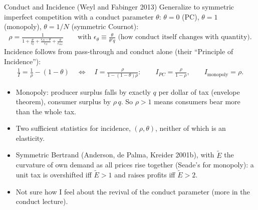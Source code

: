 \documentclass[aspectratio=169,10pt]{beamer}
\begin{document}
\begin{frame}{Conduct and Incidence (Weyl and Fabinger 2013)}
\small
Generalize to symmetric imperfect competition with a conduct parameter $\theta$: $\theta=0$ (PC), $\theta=1$ (monopoly), $\theta = 1/N$ (symmetric Cournot):
\begin{align*}
\rho=\frac{1}{1+\frac{\theta}{\epsilon_\theta}+\frac{\epsilon_D-\theta}{\epsilon_S}+\frac{\theta}{\epsilon_{m s}}}
\qquad \text{with } \epsilon_\theta \equiv \frac{\theta}{\theta' q} \text{ (how conduct itself changes with quantity)}.
\end{align*}
Incidence follows from pass-through and conduct alone (their ``Principle of Incidence''):
\begin{align*}
\frac{1}{I} = \frac{1}{\rho} - (1-\theta) \quad\Longleftrightarrow\quad I = \frac{\rho}{1 - (1-\theta)\rho}:
\qquad I_{PC} = \frac{\rho}{1-\rho}, \qquad I_{\text{monopoly}} = \rho.
\end{align*}
\begin{itemize}
\item Monopoly: producer surplus falls by exactly $q$ per dollar of tax (envelope theorem), consumer surplus by $\rho\, q$. So $\rho > 1$ means consumers bear \alert{more than the whole tax}.
\item Two sufficient statistics for incidence, $(\rho, \theta)$, neither of which is an elasticity.
\item Symmetric Bertrand (Anderson, de Palma, Kreider 2001b), with $\tilde E$ the curvature of own demand as all prices rise together (Seade's for monopoly): a unit tax is overshifted iff $\tilde E > 1$ and \alert{raises profits} iff $\tilde E > 2$.
\item Not sure how I feel about the revival of the conduct parameter (more in the conduct lecture).
\end{itemize}
\end{frame}
\end{document}
